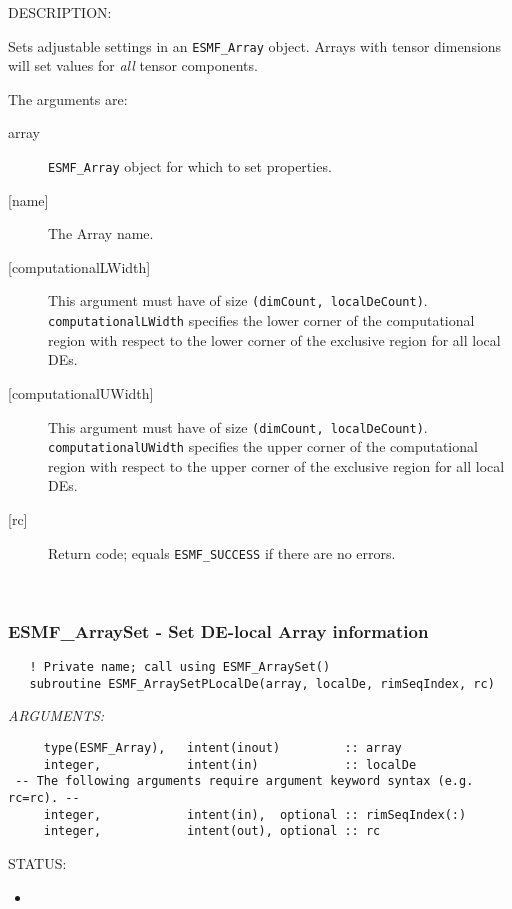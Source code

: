 {\sf DESCRIPTION:\\ }


       Sets adjustable settings in an {\tt ESMF\_Array} object. Arrays with
       tensor dimensions will set values for {\em all} tensor components.
  
       The arguments are:
       \begin{description}
       \item [array]
         {\tt ESMF\_Array} object for which to set properties.
       \item [{[name]}]
         The Array name.
       \item[{[computationalLWidth]}] 
         \begin{sloppypar}
         This argument must have of size {\tt (dimCount, localDeCount)}.
         {\tt computationalLWidth} specifies the lower corner of the
         computational region with respect to the lower corner of the exclusive
         region for all local DEs.
         \end{sloppypar}
       \item[{[computationalUWidth]}] 
         \begin{sloppypar}
         This argument must have of size {\tt (dimCount, localDeCount)}.
         {\tt computationalUWidth} specifies the upper corner of the
         computational region with respect to the upper corner of the exclusive
         region for all local DEs.
         \end{sloppypar}
       \item [{[rc]}]
         Return code; equals {\tt ESMF\_SUCCESS} if there are no errors.
       \end{description}
   
 
\mbox{}\hrulefill\ 
 
\subsubsection [ESMF\_ArraySet] {ESMF\_ArraySet - Set DE-local Array information}


  
\begin{verbatim}   ! Private name; call using ESMF_ArraySet()
   subroutine ESMF_ArraySetPLocalDe(array, localDe, rimSeqIndex, rc)
 \end{verbatim}{\em ARGUMENTS:}
\begin{verbatim}     type(ESMF_Array),   intent(inout)         :: array
     integer,            intent(in)            :: localDe
 -- The following arguments require argument keyword syntax (e.g. rc=rc). --
     integer,            intent(in),  optional :: rimSeqIndex(:)
     integer,            intent(out), optional :: rc\end{verbatim}
{\sf STATUS:}
   \begin{itemize}
   \item{}
   \end{itemize}
  
